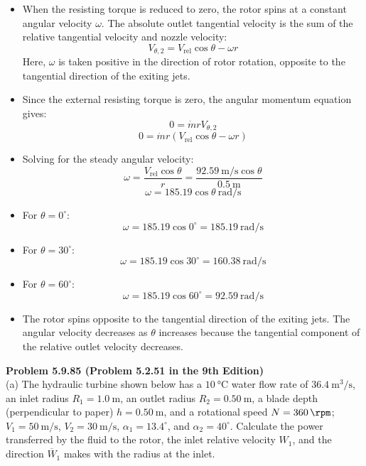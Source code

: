 ﻿\documentclass[12pt]{article}
\begin{document}
\begin{itemize}
    \[T_{\mathrm{res}}=\dot{m}rV_{\mathrm{rel}}\cos\theta\]
    \[=(\SI{5}{\kilogram\per\second})(\SI{0.5}{\meter})(\SI{92.59}{\meter\per\second})\cos\theta\]
    \[\boxed{T_{\mathrm{res}}=231.48\cos\theta\ \si{\newton\meter}}\]
    The resisting torque acts in the direction of the exiting fluid's angular momentum, opposing the torque exerted by the fluid on the rotor.
    \item When the resisting torque is reduced to zero, the rotor spins at a constant angular velocity $\omega$. The absolute outlet tangential velocity is the sum of the relative tangential velocity and nozzle velocity:
    \[V_{\theta,2}=V_{\mathrm{rel}}\cos\theta-\omega r\]
    Here, $\omega$ is taken positive in the direction of rotor rotation, opposite to the tangential direction of the exiting jets.
    \item Since the external resisting torque is zero, the angular momentum equation gives:
    \[0=\dot{m}rV_{\theta,2}\]
    \[0=\dot{m}r(V_{\mathrm{rel}}\cos\theta-\omega r)\]
    \item Solving for the steady angular velocity:
    \[\omega=\frac{V_{\mathrm{rel}}\cos\theta}{r}=\frac{\SI{92.59}{\meter\per\second}\cos\theta}{\SI{0.5}{\meter}}\]
    \[\boxed{\omega=185.19\cos\theta\ \si{\radian\per\second}}\]
    \item For $\theta=0^\circ$:
    \[\omega=185.19\cos0^\circ=\boxed{\SI{185.19}{\radian\per\second}}\]
    \item For $\theta=30^\circ$:
    \[\omega=185.19\cos30^\circ=\boxed{\SI{160.38}{\radian\per\second}}\]
    \item For $\theta=60^\circ$:
    \[\omega=185.19\cos60^\circ=\boxed{\SI{92.59}{\radian\per\second}}\]
    \item The rotor spins opposite to the tangential direction of the exiting jets. The angular velocity decreases as $\theta$ increases because the tangential component of the relative outlet velocity decreases.
\end{itemize}
\textbf{Problem 5.9.85 (Problem 5.2.51 in the 9th Edition)}\\
(a) The hydraulic turbine shown below has a $\SI{10}{\celsius}$ water flow rate of $\SI{36.4}{\meter\cubed\per\second}$, an inlet radius $R_1=\SI{1.0}{\meter}$, an outlet radius $R_2=\SI{0.50}{\meter}$, a blade depth (perpendicular to paper) $h=\SI{0.50}{\meter}$, and a rotational speed $N=\SI{360}{\rpm}$; $V_1=\SI{50}{\meter\per\second}$, $V_2=\SI{30}{\meter\per\second}$, $\alpha_1=13.4^\circ$, and $\alpha_2=40^\circ$. Calculate the power transferred by the fluid to the rotor, the inlet relative velocity $W_1$, and the direction $\overline{W}_1$ makes with the radius at the inlet.\\
\end{document}
